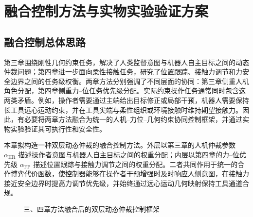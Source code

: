 \chapter{融合控制方法与实物实验验证方案}
\label{chap:ch5_fusion_experiment}

\section{融合控制总体思路}
\label{sec:ch5_motivation}

第三章围绕刚性几何约束任务，解决了人类监督意图与机器人自主目标之间的动态仲裁问题；第四章进一步面向柔性接触任务，研究了位置跟踪、接触力调节和力安全边界之间的任务级权衡。两章方法分别强调了不同层面的协同：第三章侧重人机角色分配，第四章侧重力--位任务优先级分配。实际约束操作任务通常同时包含这两类矛盾。例如，操作者需要通过主端给出目标修正或局部干预，机器人需要保持长工具远心运动约束，并在工具尖端与柔性组织或环境接触时维持期望接触力。因此，有必要将两章方法融合为统一的人机--力位--几何约束协同控制框架，并通过实物实验验证其可执行性和安全性。

本章拟构造一种双层动态仲裁的融合控制方法。外层以第三章的人机仲裁参数 $\alpha_{\mathrm{HR}}$ 描述操作者意图与机器人自主目标之间的权重分配；内层以第四章的力--位优先级 $\alpha_{\mathrm{FP}}$ 描述位置跟踪与接触力调节之间的权重分配。二者共同作用于统一的合作博弈代价函数，使控制器能够在操作者干预增强时及时响应人侧意图，在接触力接近安全边界时提高力调节优先级，并始终通过远心运动几何映射保持工具通道合规。

\begin{figure}[H]
\centering
{}
\caption{三、四章方法融合后的双层动态仲裁控制框架}
\label{fig:ch5_fusion_framework}
\end{figure}

